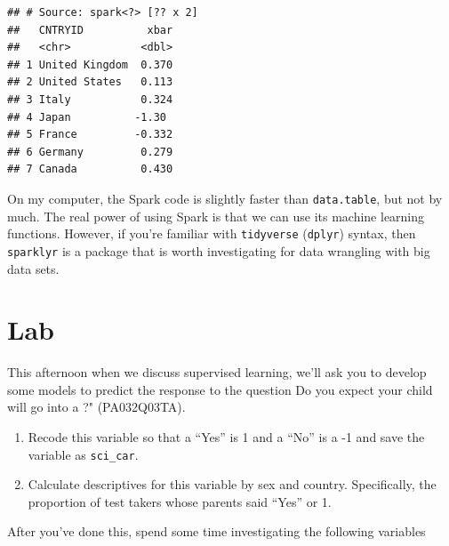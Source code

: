 \documentclass[]{book}
\begin{document}
\begin{verbatim}
## # Source: spark<?> [?? x 2]
##   CNTRYID          xbar
##   <chr>           <dbl>
## 1 United Kingdom  0.370
## 2 United States   0.113
## 3 Italy           0.324
## 4 Japan          -1.30 
## 5 France         -0.332
## 6 Germany         0.279
## 7 Canada          0.430
\end{verbatim}

On my computer, the Spark code is slightly faster than \texttt{data.table}, but not by much. The real power of using Spark is that we can use its machine learning functions. However, if you're familiar with \texttt{tidyverse} (\texttt{dplyr}) syntax, then \texttt{sparklyr} is a package that is worth investigating for data wrangling with big data sets.

\hypertarget{lab}{%
\section{Lab}\label{lab}}

This afternoon when we discuss supervised learning, we'll ask you to develop some models to predict the response to the question Do you expect your child will go into a ?" (PA032Q03TA).

\begin{enumerate}
\def\labelenumi{\arabic{enumi}.}
\item
  Recode this variable so that a ``Yes'' is 1 and a ``No'' is a -1 and save the variable as \texttt{sci\_car}.
\item
  Calculate descriptives for this variable by sex and country. Specifically, the proportion of test takers whose parents said ``Yes'' or 1.
\end{enumerate}

After you've done this, spend some time investigating the following variables
\end{document}
